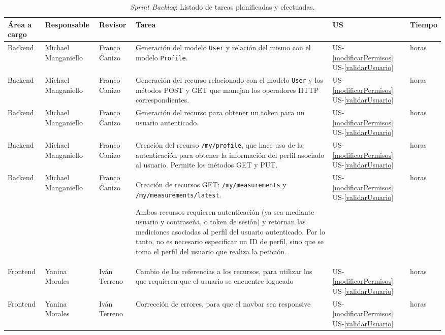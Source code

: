 \begin{table}
	\centering
		\begin{tabular}{|m{2.5cm}|>{\raggedright}m{2.5cm}|>{\raggedright}m{2.5cm}|m{7cm}|>{\centering\arraybackslash}m{1.5cm}|>{\centering\arraybackslash}m{1.5cm}|}
				\hline
				\textbf{Área a cargo} &
				\textbf{Responsable} &        
				\textbf{Revisor} &        	        
				\textbf{Tarea} &
				\textbf{US} &
				\textbf{Tiempo} \\
				\hline
				
				Backend& Michael Manganiello& Franco Canizo & Generación del modelo \texttt{User} y relación del mismo con el modelo \texttt{Profile}.  & US-\ref{modificarPermisos} \newline US-\ref{validarUsuario} & 13 horas
				\\ \hline
				Backend& Michael Manganiello& Franco Canizo & Generación del recurso relacionado con el modelo \texttt{User} y los métodos POST y GET que manejan los operadores HTTP correspondientes.  & US-\ref{modificarPermisos} \newline US-\ref{validarUsuario} & 11 horas
				\\ \hline
				Backend& Michael Manganiello & Franco Canizo& Generación del recurso para obtener un token para un usuario autenticado.  & US-\ref{modificarPermisos} \newline US-\ref{validarUsuario} & 9 horas
				\\ \hline
				Backend& Michael Manganiello & Franco Canizo& Creación del recurso \texttt{/my/profile}, que hace uso de la autenticación para obtener la información del perfil asociado al usuario. Permite los métodos GET y PUT. & US-\ref{modificarPermisos} \newline US-\ref{validarUsuario} & 4 horas
				\\ \hline
				Backend& Michael Manganiello & Franco Canizo& Creación de recursos GET: \texttt{/my/measurements} y \texttt{/my/measurements/latest}.
				
				Ambos recursos requieren autenticación (ya sea mediante usuario y contraseña, o token de sesión) y retornan las mediciones asociadas al perfil del usuario autenticado. Por lo tanto, no es necesario especificar un ID de perfil, sino que se toma el perfil del usuario que realiza la petición. & US-\ref{modificarPermisos} \newline US-\ref{validarUsuario} & 8 horas
				\\ \hline
				Frontend& Yanina Morales  & Iván Terreno& Cambio de las referencias a los recursos, para utilizar los que requieren que el usuario se encuentre logueado & US-\ref{modificarPermisos} \newline US-\ref{validarUsuario} & 12 horas
				\\ \hline
				Frontend& Yanina Morales  & Iván Terreno& Corrección de errores, para que el navbar sea responsive & US-\ref{modificarPermisos} \newline US-\ref{validarUsuario} & 8 horas
				\\ \hline		
		\end{tabular}
	\caption{\textit{Sprint Backlog}: Listado de tareas planificadas y efectuadas.}
	\label{Backlog-Sprint5}
\end{table}
